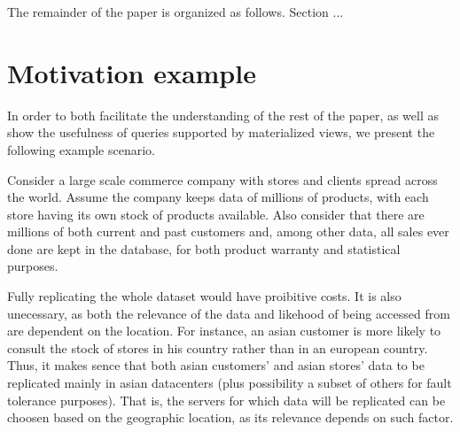 \documentclass{vldb}
\newcommand{\outline}[1]{}
\begin{document}
The remainder of the paper is organized as follows. Section ...

\outline{topicos

\begin{itemize}
	\item Num. DC a aumentar
	\item Replicar totalmente tem problemas
	\item Replicação parcial
	\item Queries sobre dados replicados parcialmente
	\begin{itemize}
		\item Standard solution?
	\end{itemize}
	\item Views materializadas replicadas totalmente
	\item Contribuições
\end{itemize}
}

\section{Motivation example}
\label{sec:example}


In order to both facilitate the understanding of the rest of the paper, as well as show the usefulness of queries supported by materialized views, we present the following example scenario.

Consider a large scale commerce company with stores and clients spread across the world.
Assume the company keeps data of millions of products, with each store having its own stock of products available.
Also consider that there are millions of both current and past customers and, among other data, all sales ever done are kept in the database, for both product warranty and statistical purposes.

Fully replicating the whole dataset would have proibitive costs.
It is also unecessary, as both the relevance of the data and likehood of being accessed from are dependent on the location.
For instance, an asian customer is more likely to consult the stock of stores in his country rather than in an european country.
Thus, it makes sence that both asian customers' and asian stores' data to be replicated mainly in asian datacenters (plus possibility a subset of others for fault tolerance purposes).
That is, the servers for which data will be replicated can be choosen based on the geographic location, as its relevance depends on such factor.
\end{document}
